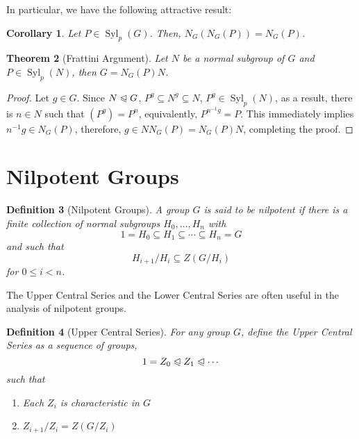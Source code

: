 \documentclass[12pt]{article}
\theoremstyle{thmstyle}
\newtheorem{theorem}{Theorem}[section]
\theoremstyle{defstyle}
\newtheorem{definition}[theorem]{Definition}
\newtheorem{corollary}[theorem]{Corollary}
\renewcommand{\le}{\leqslant}
\newcommand{\Syl}{\operatorname{Syl}}
\newcommand{\noreq}{\trianglelefteqslant}
\begin{document}
In particular, we have the following attractive result:
\begin{corollary}
    Let $P\in\Syl_p(G)$. Then, $N_G(N_G(P)) = N_G(P)$.
\end{corollary}

\begin{theorem}[Frattini Argument]
    Let $N$ be a normal subgroup of $G$ and $P\in\Syl_p(N)$, then $G = N_G(P)N$.
\end{theorem}
\begin{proof}
    Let $g\in G$. Since $N\noreq G$, $P^g\subseteq N^g\subseteq N$, $P^g\in\Syl_p(N)$, as a result, there is $n\in N$ such that $(P^g) = P^n$, equivalently, $P^{n^{-1}g} = P$. This immediately implies $n^{-1}g\in N_G(P)$, therefore, $g\in NN_G(P) = N_G(P)N$, completing the proof.
\end{proof}

\section{Nilpotent Groups}

\begin{definition}[Nilpotent Groups]
    A group $G$ is said to be \textit{nilpotent} if there is a finite collection of normal subgroups $H_0,\ldots,H_n$ with 
    \begin{equation*}
        1 = H_0\subseteq H_1\subseteq\cdots\subseteq H_n = G
    \end{equation*}
    and such that 
    \begin{equation*}
        H_{i + 1}/H_i\subseteq Z(G/H_{i})
    \end{equation*}
    for $0\le i < n$.
\end{definition}

The Upper Central Series and the Lower Central Series are often useful in the analysis of nilpotent groups.

\begin{definition}[Upper Central Series]
    For any group $G$, define the \textit{Upper Central Series} as a sequence of groups,
    \begin{equation*}
        1 = Z_0\noreq Z_1\noreq\cdots
    \end{equation*}
    such that 
    \begin{enumerate}
        \item Each $Z_i$ is characteristic in $G$ 
        \item $Z_{i + 1}/Z_i = Z(G/Z_i)$
    \end{enumerate}
\end{definition}
\end{document}

